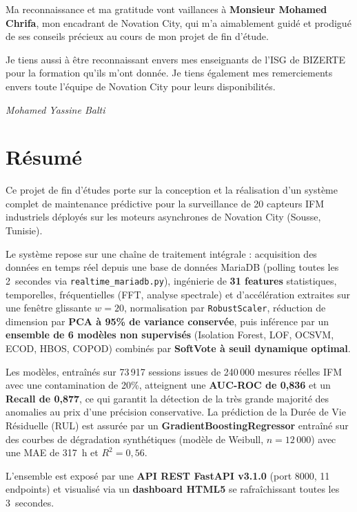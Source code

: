 \documentclass[12pt,a4paper]{report}
\begin{document}
Ma reconnaissance et ma gratitude vont vaillances à \textbf{Monsieur Mohamed Chrifa},
mon encadrant de Novation City, qui m'a aimablement guidé et prodigué de ses conseils
précieux au cours de mon projet de fin d'étude.

Je tiens aussi à être reconnaissant envers mes enseignants de l'ISG de BIZERTE pour
la formation qu'ils m'ont donnée. Je tiens également mes remerciements envers toute
l'équipe de Novation City pour leurs disponibilités.

\hfill \textit{Mohamed Yassine Balti}

\chapter*{Résumé}

Ce projet de fin d'études porte sur la conception et la réalisation d'un système
complet de maintenance prédictive pour la surveillance de 20 capteurs IFM industriels
déployés sur les moteurs asynchrones de Novation City (Sousse, Tunisie).

Le système repose sur une chaîne de traitement intégrale : acquisition des données en
temps réel depuis une base de données MariaDB (polling toutes les 2~secondes via
\texttt{realtime\_mariadb.py}), ingénierie de \textbf{31 features} statistiques, temporelles,
fréquentielles (FFT, analyse spectrale) et d'accélération extraites sur une fenêtre
glissante $w=20$, normalisation par \texttt{RobustScaler}, réduction de dimension par
\textbf{PCA à 95\% de variance conservée}, puis inférence par un \textbf{ensemble de
6 modèles non supervisés} (Isolation Forest, LOF, OCSVM, ECOD, HBOS, COPOD)
combinés par \textbf{SoftVote à seuil dynamique optimal}.

Les modèles, entraînés sur 73\,917 sessions issues de 240\,000 mesures réelles IFM avec
une contamination de 20\%, atteignent une \textbf{AUC-ROC de 0,836} et un \textbf{Recall de 0,877},
ce qui garantit la détection de la très grande majorité des anomalies au prix d'une
précision conservative. La prédiction de la Durée de Vie Résiduelle (RUL) est assurée
par un \textbf{GradientBoostingRegressor} entraîné sur des courbes de dégradation
synthétiques (modèle de Weibull, $n=12\,000$) avec une MAE de 317~h et $R^2=0{,}56$.

L'ensemble est exposé par une \textbf{API REST FastAPI v3.1.0} (port 8000, 11 endpoints)
et visualisé via un \textbf{dashboard HTML5} se rafraîchissant toutes les 3~secondes.
\end{document}
